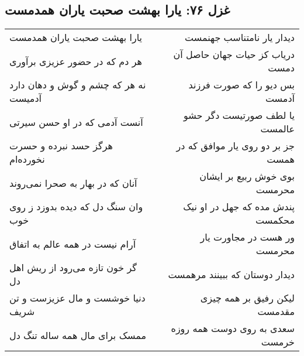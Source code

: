 \begin{center}
\section*{غزل ۷۶: یارا بهشت صحبت یاران همدمست}
\label{sec:076}
\begin{longtable}{l p{0.5cm} r}
یارا بهشت صحبت یاران همدمست
&&
دیدار یار نامتناسب جهنمست
\\
هر دم که در حضور عزیزی برآوری
&&
دریاب کز حیات جهان حاصل آن دمست
\\
نه هر که چشم و گوش و دهان دارد آدمیست
&&
بس دیو را که صورت فرزند آدمست
\\
آنست آدمی که در او حسن سیرتی
&&
یا لطف صورتیست دگر حشو عالمست
\\
هرگز حسد نبرده و حسرت نخورده‌ام
&&
جز بر دو روی یار موافق که در همست
\\
آنان که در بهار به صحرا نمی‌روند
&&
بوی خوش ربیع بر ایشان محرمست
\\
وان سنگ دل که دیده بدوزد ز روی خوب
&&
پندش مده که جهل در او نیک محکمست
\\
آرام نیست در همه عالم به اتفاق
&&
ور هست در مجاورت یار محرمست
\\
گر خون تازه می‌رود از ریش اهل دل
&&
دیدار دوستان که ببینند مرهمست
\\
دنیا خوشست و مال عزیزست و تن شریف
&&
لیکن رفیق بر همه چیزی مقدمست
\\
ممسک برای مال همه ساله تنگ دل
&&
سعدی به روی دوست همه روزه خرمست
\\
\end{longtable}
\end{center}
